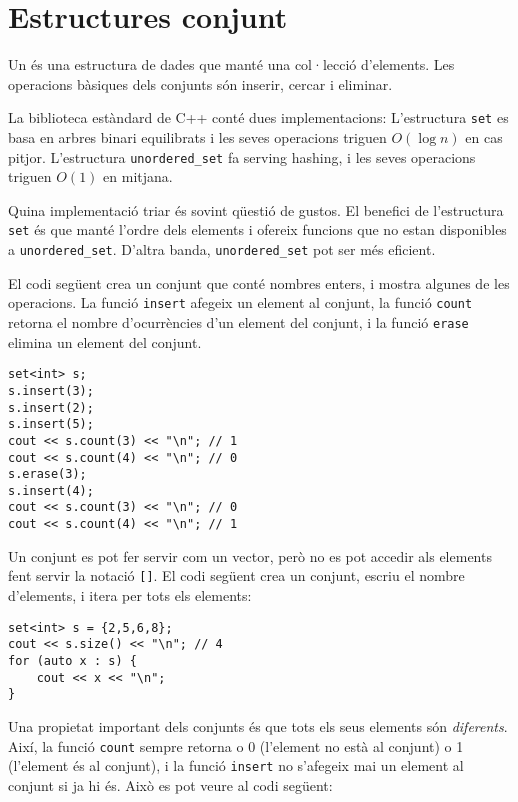 \section{Estructures conjunt}


Un  és una estructura de dades que
manté una col·lecció d'elements.
Les operacions bàsiques dels conjunts són
inserir, cercar i eliminar.

La biblioteca estàndard de C++ conté dues implementacions:
L'estructura \texttt{set} es basa en arbres binari
equilibrats i les seves operacions triguen $O(\log n)$ en cas pitjor.
L'estructura \texttt{unordered\_set} fa serving hashing,
i les seves operacions triguen $O(1)$ en mitjana.

Quina implementació triar és
sovint qüestió de gustos.
El benefici de l'estructura \texttt{set}
és que manté l'ordre dels elements
i ofereix funcions que no estan disponibles
a \texttt{unordered\_set}.
D'altra banda, \texttt{unordered\_set}
pot ser més eficient.

El codi següent crea un conjunt
que conté nombres enters,
i mostra algunes de les operacions.
La funció \texttt{insert} afegeix un element al conjunt,
la funció \texttt{count} retorna el nombre d'ocurrències
d'un element del conjunt,
i la funció \texttt{erase} elimina un element del conjunt.

\begin{lstlisting}
set<int> s;
s.insert(3);
s.insert(2);
s.insert(5);
cout << s.count(3) << "\n"; // 1
cout << s.count(4) << "\n"; // 0
s.erase(3);
s.insert(4);
cout << s.count(3) << "\n"; // 0
cout << s.count(4) << "\n"; // 1
\end{lstlisting}

Un conjunt es pot fer servir com un vector,
però no es pot accedir
als elements fent servir la notació \texttt{[]}.
El codi següent crea un conjunt,
escriu el nombre d'elements, i
itera per tots els elements:
\begin{lstlisting}
set<int> s = {2,5,6,8};
cout << s.size() << "\n"; // 4
for (auto x : s) {
    cout << x << "\n";
}
\end{lstlisting}

Una propietat important dels conjunts és
que tots els seus elements són \emph{diferents}.
Així, la funció \texttt{count} sempre retorna
o 0 (l'element no està al conjunt)
o 1 (l'element és al conjunt),
i la funció \texttt{insert} no s'afegeix mai
un element al conjunt si ja hi és.
Això es pot veure al codi següent:

